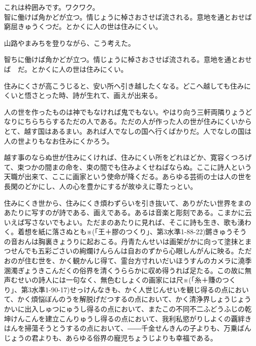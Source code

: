 \documentclass[book, twoside, paper=b5j, fleqn, jafontsize=9pt, jafontscale=1, head_space=22mm, foot_space=9mm, fore-edge=16mm, gutter=25mm, hanging_punctuation]{jlreq}
\newenvironment{framebox-guideline}[1]{\begin{ascolorbox16}{\gothic{指針}}}{\end{ascolorbox16}}
\newcommand{\blankbox}[1]{~\boxed{\phantom{aa}{\textgt{#1}}\phantom{aa}}~}
\begin{document}
\begin{framebox-guideline}
これは枠囲みです。ワクワク\footnotemark[6]。\\
智に働けば角かどが立つ。情じょうに棹さおさせば流される。意地を通とおせば窮屈きゅうくつだ。とかくに人の世は住みにくい。
\end{framebox-guideline}
山路やまみちを登りながら、こう考えた。

智ちに働けば角かどが立つ。情じょうに棹さおさせば流される。意地を通とおせば\blankbox{1}だ。とかくに人の世は住みにくい。

住みにくさが高こうじると、安い所へ引き越したくなる。どこへ越しても住みにくいと悟さとった時、詩が生れて、画えが出来る。

人の世を作ったものは神でもなければ鬼でもない。やはり向う三軒両隣りょうどなりにちらちらするただの人である。ただの人が作った人の世が住みにくいからとて、越す国はあるまい。あれば人でなしの国へ行くばかりだ。人でなしの国は人の世よりもなお住みにくかろう。

越す事のならぬ世が住みにくければ、住みにくい所をどれほどか、寛容くつろげて、束つかの間まの命を、束の間でも住みよくせねばならぬ。ここに詩人という天職が出来て、ここに画家という使命が降くだる。あらゆる芸術の士は人の世を長閑のどかにし、人の心を豊かにするが故ゆえに尊たっとい。

住みにくき世から、住みにくき煩わずらいを引き抜いて、ありがたい世界をまのあたりに写すのが詩である、画えである。あるは音楽と彫刻である。こまかに云いえば写さないでもよい。ただまのあたりに見れば、そこに詩も生き、歌も湧わく。着想を紙に落さぬとも※(「王＋膠のつくり」、第3水準1-88-22)鏘きゅうそうの音おんは胸裏きょうりに起おこる。丹青たんせいは画架がかに向って塗抹とまつせんでも五彩ごさいの絢爛けんらんは自おのずから心眼しんがんに映る。ただおのが住む世を、かく観かんじ得て、霊台方寸れいだいほうすんのカメラに澆季溷濁ぎょうきこんだくの俗界を清くうららかに収め得うれば足たる。この故に無声むせいの詩人には一句なく、無色むしょくの画家には尺※(「糸＋賺のつくり」、第3水準1-90-17)せっけんなきも、かく人世じんせいを観じ得るの点において、かく煩悩ぼんのうを解脱げだつするの点において、かく清浄界しょうじょうかいに出入しゅつにゅうし得るの点において、またこの不同不二ふどうふじの乾坤けんこんを建立こんりゅうし得るの点において、我利私慾がりしよくの覊絆きはんを掃蕩そうとうするの点において、――千金せんきんの子よりも、万乗ばんじょうの君よりも、あらゆる俗界の寵児ちょうじよりも幸福である。
\end{document}
